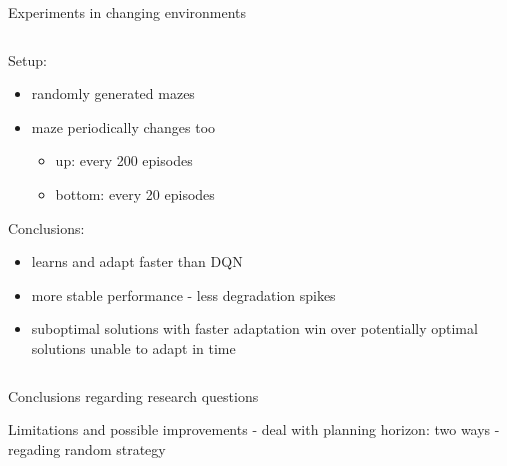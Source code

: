 \documentclass[default]{beamer}
\begin{document}
\begin{frame}{Experiments in changing environments}
\begin{columns}
	\begin{column}{.55\textwidth}
	Setup:
	\begin{itemize}
		\item randomly generated mazes
		\item maze periodically changes too
		\begin{itemize}
			\item up: every 200 episodes
			\item bottom: every 20 episodes
		\end{itemize}
	\end{itemize}

	\vspace*{12pt}
	Conclusions:
	\begin{itemize}
		\item learns and adapt faster than DQN
		\item more stable performance - less degradation spikes
		\item suboptimal solutions with faster adaptation win over potentially optimal solutions unable to adapt in time
	\end{itemize}

	\end{column}

	\begin{column}{.45\textwidth}
	\begin{center}
		
		
	\end{center}
	\end{column}
\end{columns}
\end{frame}

\begin{frame}{Conclusions}
	regarding research questions
\end{frame}

\begin{frame}{Limitations and possible improvements}
	- deal with planning horizon: two ways
	- regading random strategy	
\end{frame}
\end{document}
